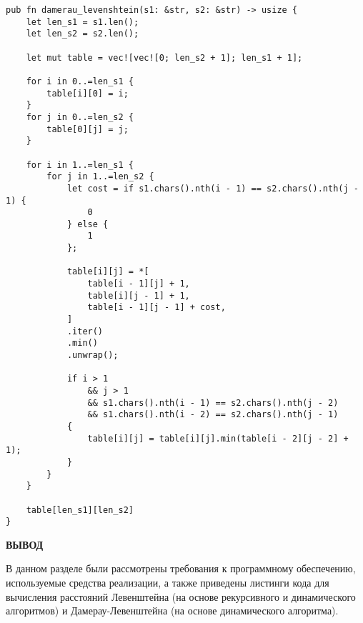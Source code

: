 \begin{center}
\captionsetup{justification=raggedright,singlelinecheck=off}
\begin{lstlisting}[label=lst:dam_lev_dyn,caption=Функция нахождения расстояния Дамерау–Левенштейна динамически]
pub fn damerau_levenshtein(s1: &str, s2: &str) -> usize {
    let len_s1 = s1.len();
    let len_s2 = s2.len();

    let mut table = vec![vec![0; len_s2 + 1]; len_s1 + 1];

    for i in 0..=len_s1 {
        table[i][0] = i;
    }
    for j in 0..=len_s2 {
        table[0][j] = j;
    }

    for i in 1..=len_s1 {
        for j in 1..=len_s2 {
            let cost = if s1.chars().nth(i - 1) == s2.chars().nth(j - 1) {
                0
            } else {
                1
            };

            table[i][j] = *[
                table[i - 1][j] + 1,
                table[i][j - 1] + 1,
                table[i - 1][j - 1] + cost,
            ]
            .iter()
            .min()
            .unwrap();

            if i > 1
                && j > 1
                && s1.chars().nth(i - 1) == s2.chars().nth(j - 2)
                && s1.chars().nth(i - 2) == s2.chars().nth(j - 1)
            {
                table[i][j] = table[i][j].min(table[i - 2][j - 2] + 1);
            }
        }
    }

    table[len_s1][len_s2]
}
\end{lstlisting}
\end{center}

\clearpage

\textbf{ВЫВОД}

В данном разделе были рассмотрены требования к программному обеспечению, используемые средства реализации, а также приведены листинги кода для вычисления расстояний Левенштейна (на основе рекурсивного и динамического алгоритмов) и Дамерау-Левенштейна (на основе динамического алгоритма).

\clearpage